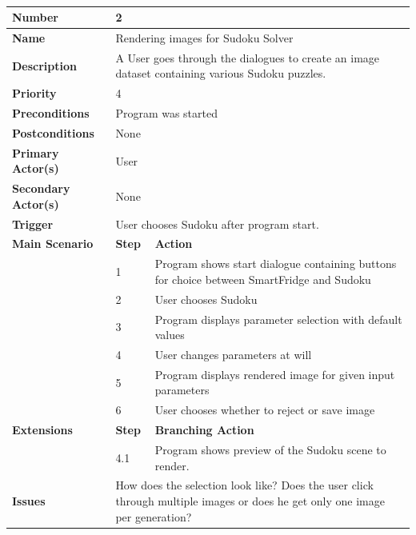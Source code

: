 \documentclass[a4paper,12pt]{article}
\begin{document}
 \\
\begin{tabularx}{\linewidth}{|l|l|X|}
\hline
\textbf{Number} & \multicolumn{2}{l|}{2} \\
\hline
\textbf{Name} & \multicolumn{2}{l|}{Rendering images for Sudoku Solver} \\
\hline
\textbf{Description} &  \multicolumn{2}{X|}{A User goes through the dialogues to create an image dataset containing various Sudoku puzzles.} \\
\hline
\textbf{Priority} & \multicolumn{2}{l|}{4} \\
\hline
\textbf{Preconditions} & \multicolumn{2}{l|}{Program was started} \\
\hline
\textbf{Postconditions} & \multicolumn{2}{l|}{None} \\
\hline
\textbf{Primary Actor(s)} & \multicolumn{2}{l|}{User} \\
\hline
\textbf{Secondary Actor(s)} & \multicolumn{2}{l|}{None} \\
\hline
\textbf{Trigger} & \multicolumn{2}{l|}{User chooses Sudoku after program start.} \\
\hline
\textbf{Main Scenario} & \textbf{Step} & \textbf{Action} \\
\hline
 & 1 & Program shows start dialogue containing buttons for choice between SmartFridge and Sudoku\\
\cline{2-3}
 & 2 & User chooses Sudoku \\
\cline{2-3}
 & 3 & Program displays parameter selection with default values\\
\cline{2-3}
 & 4 & User changes parameters at will \\
\cline{2-3}
 & 5 & Program displays rendered image for given input parameters \\
\cline{2-3}
 & 6 & User chooses whether to reject or save image \\
\hline
\textbf{Extensions} & \textbf{Step} & \textbf{Branching Action} \\
\hline
& 4.1 & Program shows preview of the Sudoku scene to render. \\
\hline
\textbf{Issues} & \multicolumn{2}{X|}{How does the selection look like? Does the user click through multiple images or does he get only one image per generation?} \\
\hline
\end{tabularx}
 \\
 \\
 \\
\end{document}
